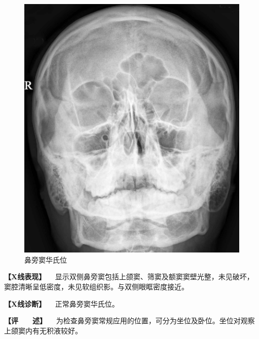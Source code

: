 \begin{figure}[!htbp]
 \centering
 \includegraphics{./images/Image00414.jpg}
 \captionsetup{justification=centering}
 \caption{鼻旁窦华氏位}
 \label{fig7-1-4}
  \end{figure} 

\textbf{【X线表现】}
　显示双侧鼻旁窦包括上颌窦、筛窦及额窦窦壁光整，未见破坏，窦腔清晰呈低密度，未见软组织影。与双侧眼眶密度接近。

\textbf{【X线诊断】} 　正常鼻旁窦华氏位。

\textbf{【评　　述】}
　为检查鼻旁窦常规应用的位置，可分为坐位及卧位。坐位对观察上颌窦内有无积液较好。

